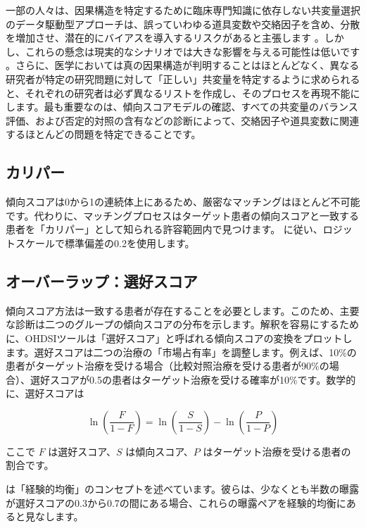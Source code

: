 \documentclass[
  11pt]{book}
\theoremstyle{definition}
\theoremstyle{definition}
\theoremstyle{definition}
\theoremstyle{definition}
\theoremstyle{remark}
\begin{document}
一部の人々は、因果構造を特定するために臨床専門知識に依存しない共変量選択のデータ駆動型アプローチは、誤っていわゆる道具変数や交絡因子を含め、分散を増加させ、潜在的にバイアスを導入するリスクがあると主張します \citep{hernan_2002}。しかし、これらの懸念は現実的なシナリオでは大きな影響を与える可能性は低いです \citep{schneeweiss_2018}。さらに、医学においては真の因果構造が判明することはほとんどなく、異なる研究者が特定の研究問題に対して「正しい」共変量を特定するように求められると、それぞれの研究者は必ず異なるリストを作成し、そのプロセスを再現不能にします。最も重要なのは、傾向スコアモデルの確認、すべての共変量のバランス評価、および否定的対照の含有などの診断によって、交絡因子や道具変数に関連するほとんどの問題を特定できることです。  

\subsection{カリパー}\label{ux30abux30eaux30d1ux30fc}


傾向スコアは0から1の連続体上にあるため、厳密なマッチングはほとんど不可能です。代わりに、マッチングプロセスはターゲット患者の傾向スコアと一致する患者を「カリパー」として知られる許容範囲内で見つけます。 \citet{austin_2011} に従い、ロジットスケールで標準偏差の0.2を使用します。

\subsection{オーバーラップ：選好スコア}\label{ux30aaux30fcux30d0ux30fcux30e9ux30c3ux30d7ux9078ux597dux30b9ux30b3ux30a2}


傾向スコア方法は一致する患者が存在することを必要とします。このため、主要な診断は二つのグループの傾向スコアの分布を示します。解釈を容易にするために、OHDSIツールは「選好スコア」と呼ばれる傾向スコアの変換をプロットします。選好スコアは二つの治療の「市場占有率」を調整します。例えば、10\%の患者がターゲット治療を受ける場合（比較対照治療を受ける患者が90\%の場合）、選好スコアが0.5の患者はターゲット治療を受ける確率が10\%です。数学的に、選好スコアは

\[\ln\left(\frac{F}{1-F}\right)=\ln\left(\frac{S}{1-S}\right)-\ln\left(\frac{P}{1-P}\right)\]

ここで \(F\) は選好スコア、\(S\) は傾向スコア、\(P\) はターゲット治療を受ける患者の割合です。

\citet{walker_2013} は「経験的均衡」のコンセプトを述べています。彼らは、少なくとも半数の曝露が選好スコアの0.3から0.7の間にある場合、これらの曝露ペアを経験的均衡にあると見なします。 
\end{document}
